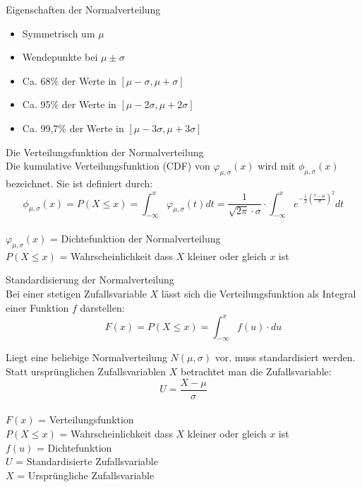 \begin{theorem}{Eigenschaften der Normalverteilung}
    \begin{itemize}
        \item Symmetrisch um $\mu$
        \item Wendepunkte bei $\mu \pm \sigma$
        \item Ca. 68\% der Werte in $[\mu-\sigma, \mu+\sigma]$
        \item Ca. 95\% der Werte in $[\mu-2\sigma, \mu+2\sigma]$
        \item Ca. 99,7\% der Werte in $[\mu-3\sigma, \mu+3\sigma]$
    \end{itemize}
\end{theorem}

\begin{definition}{Die Verteilungsfunktion der Normalverteilung}\\
Die kumulative Verteilungsfunktion (CDF) von $\varphi_{\mu,\sigma}(x)$ wird mit $\phi_{\mu,\sigma}(x)$ bezeichnet. Sie ist definiert durch:
$$
\phi_{\mu,\sigma}(x) = P(X \leq x) = \int_{-\infty}^x \varphi_{\mu,\sigma}(t)dt = \frac{1}{\sqrt{2\pi} \cdot \sigma} \cdot \int_{-\infty}^x e^{-\frac{1}{2}(\frac{t-\mu}{\sigma})^2} dt
$$
\\
$\varphi_{\mu,\sigma}(x)$ = Dichtefunktion der Normalverteilung\\
$P(X \leq x)$ = Wahrscheinlichkeit dass $X$ kleiner oder gleich $x$ ist
\end{definition}

\begin{concept}{Standardisierung der Normalverteilung}\\
Bei einer stetigen Zufallsvariable $X$ lässt sich die Verteilungsfunktion als Integral einer Funktion $f$ darstellen:
\vspace{-2mm}\\
$$
\quad \quad F(x) = P(X \leq x) = \int_{-\infty}^x f(u) \cdot du
$$

Liegt eine beliebige Normalverteilung $N(\mu,\sigma)$ vor, muss standardisiert werden. Statt ursprünglichen Zufallsvariablen $X$ betrachtet man die Zufallsvariable:
\vspace{-2mm}\\
$$
U = \frac{X-\mu}{\sigma}
$$
\\
$F(x)$ = Verteilungsfunktion\\
$P(X \leq x)$ = Wahrscheinlichkeit dass $X$ kleiner oder gleich $x$ ist\\
$f(u)$ = Dichtefunktion\\
$U$ = Standardisierte Zufallsvariable\\
$X$ = Ursprüngliche Zufallsvariable\\
\end{concept}

